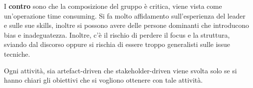 \begin{itemize}
\begin{enumerate}
                        I \textbf{contro} sono che la composizione del gruppo è 
                        critica, viene vista come un'operazione time consuming. 
                        Si fa molto affidamento sull'esperienza del leader e 
                        sulle sue skills, inoltre si possono avere delle persone 
                        dominanti che introducono bias e inadeguatezza. Inoltre,
                        c'è il rischio di perdere il focus e la struttura, sviando 
                        dal discorso oppure si rischia di essere troppo generalisti 
                        sulle issue tecniche.
      \end{enumerate}
\end{itemize}
Ogni attività, sia artefact-driven che stakeholder-driven viene svolta solo se
si hanno chiari gli obiettivi che si vogliono ottenere con tale attività.
